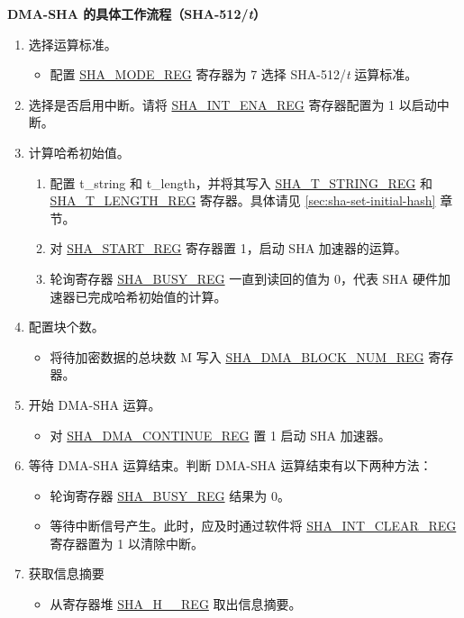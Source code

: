 \textbf{DMA-SHA 的具体工作流程（SHA-512/{\it{t}}）}

\begin{enumerate}
    \item 选择运算标准。
        \begin{itemize}
            \item 配置 \hyperref[regdesc:SHAMODEREG]{SHA\_MODE\_REG} 寄存器为 7 选择 SHA-512/{\it{t}} 运算标准。
        \end{itemize}
    \item 选择是否启用中断。请将 \hyperref[regdesc:SHAINTENAREG]{SHA\_INT\_ENA\_REG} 寄存器配置为 1 以启动中断。
    \item 计算哈希初始值。
        \begin{enumerate}
            \item 配置 t\_string 和 t\_length，并将其写入 \hyperref[regdesc:SHATSTRINGREG]{SHA\_T\_STRING\_REG} 和 \hyperref[regdesc:SHATLENGTHREG]{SHA\_T\_LENGTH\_REG} 寄存器。具体请见 \ref{sec:sha-set-initial-hash} 章节。
            \item 对 \hyperref[regdesc:SHASTARTREG]{SHA\_START\_REG} 寄存器置 1，启动 SHA 加速器的运算。
            \item 轮询寄存器 \hyperref[regdesc:SHABUSYREG]{SHA\_BUSY\_REG} 一直到读回的值为 0，代表 SHA 硬件加速器已完成哈希初始值的计算。
        \end{enumerate}
    \item 配置块个数。
        \begin{itemize}
            \item 将待加密数据的总块数 M 写入  \hyperref[regdesc:SHADMABLOCKNUMREG]{SHA\_DMA\_BLOCK\_NUM\_REG} 寄存器。
        \end{itemize}
    \item 开始 DMA-SHA 运算。
        \begin{itemize}
            \item 对 \hyperref[regdesc:SHADMACONTINUEREG]{SHA\_DMA\_CONTINUE\_REG} 置 1 启动 SHA 加速器。
        \end{itemize}
    \item 等待 DMA-SHA 运算结束。判断 DMA-SHA 运算结束有以下两种方法：
        \begin{itemize}
            \item 轮询寄存器 \hyperref[regdesc:SHABUSYREG]{SHA\_BUSY\_REG} 结果为 0。
            \item 等待中断信号产生。此时，应及时通过软件将 \hyperref[regdesc:SHAINTCLEARREG]{SHA\_INT\_CLEAR\_REG} 寄存器置为 1 以清除中断。
        \end{itemize} 
    \item 获取信息摘要
        \begin{itemize}
            \item 从寄存器堆 \hyperref[regdesc:SHAHNREG]{SHA\_H\_\_REG} 取出信息摘要。
        \end{itemize}
\end{enumerate}
